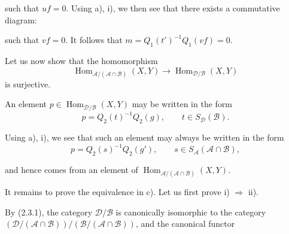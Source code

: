 \clearpage
{}%
\begingroup
\small
\setlength{\parskip}{0pt}%
\setlength{\emergencystretch}{1.5em}%
\setlength{\abovedisplayskip}{3pt plus 1pt minus 1pt}%
\setlength{\belowdisplayskip}{3pt plus 1pt minus 1pt}%

\noindent such that $uf=0$. Using a), i), we then see that there exists a
commutative diagram:

\begin{center}
\end{center}

\noindent such that $vf=0$. It follows that
$m=Q_1(t')^{-1}Q_1(vf)=0$.

Let us now show that the homomorphism
\[
  \operatorname{Hom}_{\mathcal A/(\mathcal A\cap\mathcal B)}(X,Y)
  \longrightarrow
  \operatorname{Hom}_{\mathcal D/\mathcal B}(X,Y)
\]
is surjective.

An element $p\in\operatorname{Hom}_{\mathcal D/\mathcal B}(X,Y)$ may be
written in the form
\[
  p=Q_2(t)^{-1}Q_2(g),\qquad t\in S_{\mathcal D}(\mathcal B).
\]

Using a), i), we see that such an element may always be written in the form
\[
  p=Q_2(s)^{-1}Q_2(g'),\qquad
  s\in S_{\mathcal A}(\mathcal A\cap\mathcal B),
\]

\noindent and hence comes from an element of
$\operatorname{Hom}_{\mathcal A/(\mathcal A\cap\mathcal B)}(X,Y)$.

It remains to prove the equivalence in c). Let us first prove i)
$\Rightarrow$ ii).

By (2.3.1), the category $\mathcal D/\mathcal B$ is canonically isomorphic
to the category
$(\mathcal D/(\mathcal A\cap\mathcal B))
/(\mathcal B/(\mathcal A\cap\mathcal B))$, and the canonical functor


